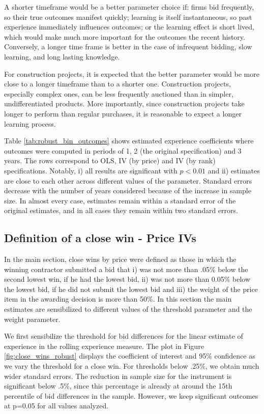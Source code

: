 A shorter timeframe would be a better parameter choice if: firms bid frequently, so their true outcomes manifest quickly;  learning is itself instantaneous,  so past experience immediately influences outcomes; or  the learning effect is short lived, which would make much more important for the outcomes the recent history. Conversely, a longer time frame is better in the case of infrequent bidding, slow learning, and long lasting knowledge.

For construction projects, it is expected that the better parameter would be more close to a longer timeframe than to a shorter one. Construction projects, especially complex ones, can be less frequently auctioned than in simpler, undifferentiated products. More importantly, since construction projects take longer to perform than regular purchases, it is reasonable to expect a longer learning process.

Table \ref{tab:robust_bin_outcomes} shows estimated experience coefficients where outcomes were computed in periods of 1, 2 (the original specification) and 3 years. The rows correspond to OLS, IV (by price) and IV (by rank) specifications. Notably, i) all results are significant with $p<0.01$ and ii) estimates are close to each other across different values of the parameter. Standard errors decrease with the number of years considered because of the increase in sample size. In almost every case, estimates remain within a standard error of the original estimates, and in all cases they remain within two standard errors.


\subsection{Definition of a close win - Price IVs}
In the main section, close wins by price were defined as those in which the winning contractor submitted a bid that i) was not more than .05\% below the second lowest win, if he had the lowest bid, ii) was not more than 0.05\% below the lowest bid, if he did not submit the lowest bid and iii) the weight of the price item in the awarding decision is more than 50\%. In this section the main estimates are sensibilized to different values of the threshold parameter and the weight parameter.

We first sensibilize the threshold for bid differences for the linear estimate of experience in the rolling experience measure. The plot in Figure \ref{fig:close_wins_robust} displays the coefficient of interest and 95\% confidence as we vary the threshold for a close win.  For thresholds below .25\%, we obtain much wider standard errors. The reduction in sample size for the instrument is significant below .5\%, since this percentage is already at around the 15th percentile of bid differences in the sample. However, we keep significant outcomes at p=0.05 for all values analyzed.

